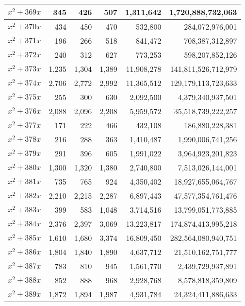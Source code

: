 \documentclass[a4paper]{amsproc}
\theoremstyle{plain}
\begin{document}
\begin{longtable}{ | l | r | r | r | r | r | }
$x^2 + 369x$ & 345 & 426 & 507 & 1{,}311{,}642 & 1{,}720{,}888{,}732{,}063 \\ \hline
$x^2 + 370x$ & 434 & 450 & 470 & 532{,}800 & 284{,}072{,}976{,}001 \\ \hline
$x^2 + 371x$ & 196 & 266 & 518 & 841{,}472 & 708{,}387{,}312{,}897 \\ \hline
$x^2 + 372x$ & 240 & 312 & 627 & 773{,}253 & 598{,}207{,}852{,}126 \\ \hline
$x^2 + 373x$ & 1{,}235 & 1{,}304 & 1{,}389 & 11{,}908{,}278 & 141{,}811{,}526{,}712{,}979 \\ \hline
$x^2 + 374x$ & 2{,}706 & 2{,}772 & 2{,}992 & 11{,}365{,}512 & 129{,}179{,}113{,}723{,}633 \\ \hline
$x^2 + 375x$ & 255 & 300 & 630 & 2{,}092{,}500 & 4{,}379{,}340{,}937{,}501 \\ \hline
$x^2 + 376x$ & 2{,}088 & 2{,}096 & 2{,}208 & 5{,}959{,}572 & 35{,}518{,}739{,}222{,}257 \\ \hline
$x^2 + 377x$ & 171 & 222 & 466 & 432{,}108 & 186{,}880{,}228{,}381 \\ \hline
$x^2 + 378x$ & 216 & 288 & 363 & 1{,}410{,}487 & 1{,}990{,}006{,}741{,}256 \\ \hline
$x^2 + 379x$ & 291 & 396 & 605 & 1{,}991{,}022 & 3{,}964{,}923{,}201{,}823 \\ \hline
$x^2 + 380x$ & 1{,}300 & 1{,}320 & 1{,}380 & 2{,}740{,}800 & 7{,}513{,}026{,}144{,}001 \\ \hline
$x^2 + 381x$ & 735 & 765 & 924 & 4{,}350{,}402 & 18{,}927{,}655{,}064{,}767 \\ \hline
$x^2 + 382x$ & 2{,}210 & 2{,}215 & 2{,}287 & 6{,}897{,}443 & 47{,}577{,}354{,}761{,}476 \\ \hline
$x^2 + 383x$ & 399 & 583 & 1{,}048 & 3{,}714{,}516 & 13{,}799{,}051{,}773{,}885 \\ \hline
$x^2 + 384x$ & 2{,}376 & 2{,}397 & 3{,}069 & 13{,}223{,}817 & 174{,}874{,}413{,}995{,}218 \\ \hline
$x^2 + 385x$ & 1{,}610 & 1{,}680 & 3{,}374 & 16{,}809{,}450 & 282{,}564{,}080{,}940{,}751 \\ \hline
$x^2 + 386x$ & 1{,}804 & 1{,}840 & 1{,}890 & 4{,}637{,}712 & 21{,}510{,}162{,}751{,}777 \\ \hline
$x^2 + 387x$ & 783 & 810 & 945 & 1{,}561{,}770 & 2{,}439{,}729{,}937{,}891 \\ \hline
$x^2 + 388x$ & 852 & 888 & 968 & 2{,}928{,}768 & 8{,}578{,}818{,}359{,}809 \\ \hline
$x^2 + 389x$ & 1{,}872 & 1{,}894 & 1{,}987 & 4{,}931{,}784 & 24{,}324{,}411{,}886{,}633 \\ \hline

\end{longtable}
\end{document}
